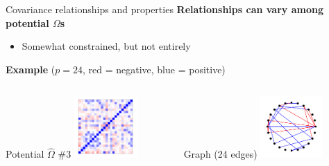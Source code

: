 \documentclass[professionalfonts]{beamer}
\begin{document}
\begin{frame}{Covariance relationships and properties}
\textbf{Relationships can vary among potential $\Omega$s}
\begin{itemize}
\item Somewhat constrained, but not entirely
\end{itemize}
\textbf{Example} ($p = 24$, {\color{red} red} = negative, {\color{blue} blue} = positive)
\begin{columns}
\begin{column}{0.45\textwidth}
\begin{center}
Potential $\widehat{\Omega}$ \#3
\includegraphics[width=90px]{figs/example-alt3-cor.pdf}
\end{center}
\end{column}
\begin{column}{0.45\textwidth}
\begin{center}
Graph (24 edges)
\includegraphics[width=90px]{figs/example-alt3-graph.pdf}
\end{center}
\end{column}
\end{columns}
\end{frame}
\end{document}
